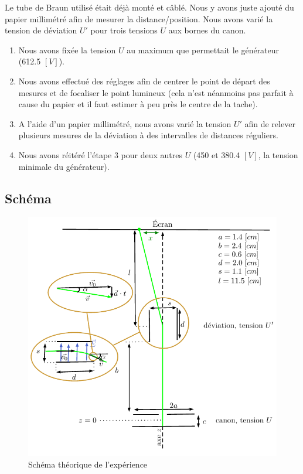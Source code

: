 \documentclass[11pt]{article}
\begin{document}
Le tube de Braun utilisé était déjà monté et câblé. Nous y avons juste ajouté du papier millimétré afin de mesurer la distance/position. Nous avons varié la tension de déviation $U'$ pour trois tensions $U$ aux bornes du canon. 
\begin{enumerate}
\item Nous avons fixée la tension $U$ au maximum que permettait le générateur (612.5 $[V]$).
\item Nous avons effectué des réglages afin de centrer le point de départ des mesures et de focaliser le point lumineux (cela n'est néanmoins pas parfait à cause du papier et il faut estimer à peu près le centre de la tache). 
\item A l'aide d'un papier millimétré, nous avons varié la tension $U'$ afin de relever plusieurs mesures de la déviation à des intervalles de distances réguliers.
\item Nous avons réitéré l'étape 3 pour deux autres $U$ (450 et 380.4 $[V]$, la tension minimale du générateur).
\end{enumerate}

\subsection{Schéma}

\begin{figure}[H]
\center
 \includegraphics[scale=1]{Images/schm-th.pdf}
\caption{Schéma théorique de l'expérience}
\label{fig:schm-th}
\end{figure}
\end{document}
